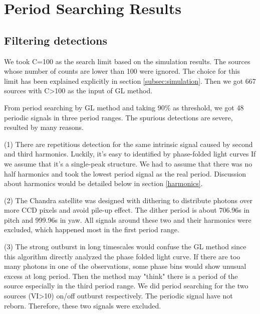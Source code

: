 \documentclass[twoside,twocolumn]{aastex63}
\begin{document}
\section{Period Searching Results}\label{sec:results}
\subsection{Filtering detections}
We took C=100 as the search limit based on the simulation results. The sources whose number of counts are lower than 100 were ignored. The choice for this limit has been explained explicitly in section \ref{subsec:simulation}. Then we got 667 sources with C>100 as the input of GL method.

From period searching by GL method and taking 90\% as threshold, we got 48 periodic signals in three period ranges. The spurious detections are severe, resulted by many reasons.

(1) There are repetitious detection for the same intrinsic signal caused by second and third harmonics. Luckily, it's easy to identified by phase-folded light curves If we assume that it's a single-peak structure. We had to assume that there was no half harmonics and took the lowest period signal as the real period. Discussion about harmonics would be detailed below in section \ref{harmonics}. 

(2) The Chandra satellite was designed with dithering to distribute photons over more CCD pixels and avoid pile-up effect. The dither period is about 706.96s in pitch and 999.96s in yaw. All signals around these two and their harmonics were excluded, which happened most in the first period range.

(3) The strong outburst in long timescales would confuse the GL method since this algorithm directly analyzed the phase folded light curve. If there are too many photons in one of the observations, some phase bins would show unusual excess at long period. Then the method may "think" there is a period of the source especially in the third period range. We did period searching for the two sources (VI>10)  on/off outburst respectively. The periodic signal have not reborn. Therefore, these two  signals were excluded. 

\end{document}
